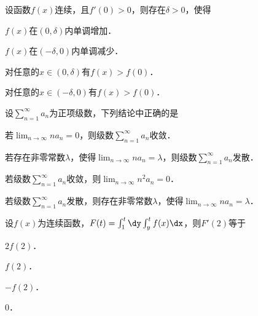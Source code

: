 \documentclass[plain,noanswer,medmath]{../../template/jnuexam}
\begin{document}
\begin{problem}
设函数$f(x)$连续，且$f'(0) > 0$，则存在$\delta > 0$，使得\pickout{}
\begin{abcd}
\item $f(x)$在$(0,\delta)$内单调增加．
\item $f(x)$在$(- \delta ,0)$内单调减少．
\item 对任意的$x \in(0,\delta)$有$f(x) > f(0)$．
\item 对任意的$x \in(- \delta ,0)$有$f(x) > f(0)$．
\end{abcd}
\end{problem}


\begin{problem}
设$\sum_{n = 1}^{\infty}a_n$为正项级数，下列结论中正确的是\pickout{}
\begin{abcd}
\item 若$\lim_{n \to \infty} na_n = 0$，则级数$\sum_{n = 1}^{\infty}a_n$收敛．
\item 若存在非零常数$\lambda$，使得$\lim_{n \to \infty} na_n = \lambda$，则级数$\sum_{n = 1}^{\infty}a_n$发散．
\item 若级数$\sum_{n = 1}^{\infty}a_n$收敛，则$\lim_{n \to \infty} n^2a_n = 0$．
\item 若级数$\sum_{n = 1}^{\infty}a_n$发散，则存在非零常数$\lambda$，使得$\lim_{n \to \infty} na_n = \lambda$．
\end{abcd}
\end{problem}


\begin{problem}
设$f(x)$为连续函数，$F(t) = \int_1^t \dy\int_y^t f(x)\dx$，则$F'(2)$等于\pickout{}
\begin{abcd}
\item $2f(2)$．
\item $f(2)$．
\item $- f(2)$．
\item $0$．
\end{abcd}
\end{problem}
\end{document}
